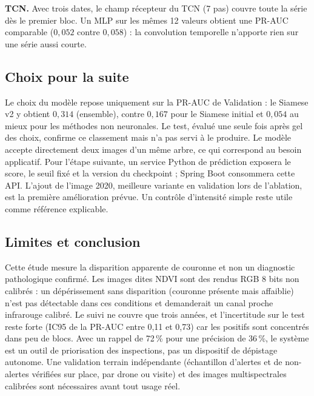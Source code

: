 \textbf{TCN.} Avec trois dates, le champ récepteur du TCN (7 pas)
couvre toute la série dès le premier bloc. Un MLP sur les mêmes 12
valeurs obtient une PR-AUC comparable ($0{,}052$ contre $0{,}058$) :
la convolution temporelle n'apporte rien sur une série aussi courte.


\subsection{Choix pour la suite}
Le choix du modèle repose uniquement sur la PR-AUC de Validation : le
Siamese v2 y obtient $0{,}314$ (ensemble), contre $0{,}167$ pour le
Siamese initial et $0{,}054$ au mieux pour les méthodes non
neuronales. Le test, évalué une seule fois après gel des choix, confirme
ce classement mais n'a pas servi à le produire. Le modèle accepte
directement deux images d'un même arbre, ce qui correspond au besoin
applicatif. Pour l'étape suivante, un service Python de prédiction
exposera le score, le seuil fixé et la version du checkpoint ; Spring
Boot consommera cette API. L'ajout de l'image 2020, meilleure variante
en validation lors de l'ablation, est la première amélioration prévue.
Un contrôle d'intensité simple reste utile comme référence explicable.


\subsection{Limites et conclusion}
Cette étude mesure la disparition apparente de couronne et non un
diagnostic pathologique confirmé. Les images dites NDVI sont des rendus
RGB 8 bits non calibrés : un dépérissement sans disparition (couronne
présente mais affaiblie) n'est pas détectable dans ces conditions et
demanderait un canal proche infrarouge calibré. Le suivi ne couvre que
trois années, et l'incertitude sur le test reste forte (IC95 de la
PR-AUC entre 0,11 et 0,73) car les positifs sont concentrés dans peu de
blocs. Avec un rappel de 72\,\% pour une précision de 36\,\%, le
système est un outil de priorisation des inspections, pas un dispositif
de dépistage autonome. Une validation terrain indépendante (échantillon
d'alertes et de non-alertes vérifiées sur place, par drone ou visite)
et des images multispectrales calibrées sont nécessaires avant tout
usage réel.
